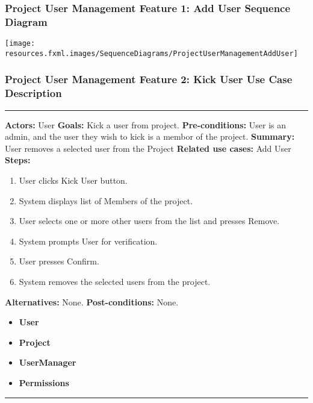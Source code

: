 \documentclass[twoside,letterpaper]{article}
\begin{document}
\subsubsection[Project User Management Feature 1: Add User Sequence Diagram]{\rmfamily\bfseries\color{black}
	Project User Management Feature 1: Add User Sequence Diagram}
\hypertarget{RefHeading22059017292}{}

\texttt{[image: resources.fxml.images/SequenceDiagrams/ProjectUserManagementAddUser]}

\newpage
\subsubsection[Project User Management Feature 2: Kick User Use Case Description]{\rmfamily\bfseries\color{black}
	Project User Management Feature 2: Kick User Use Case Description}
\hypertarget{RefHeading22059017292}{}

\vspace{2pt}
\hrule
\vspace{8pt}
 \textbf{Actors:} User \newline
\textbf{Goals:} Kick a user from project. \newline
 \textbf{Pre-conditions:} User is an admin, and the user they wish to kick is a membor of the project. \newline
 \textbf{Summary:} User removes a selected user from the Project \newline
\textbf{Related use cases:} Add User \newline
\textbf{Steps:} \begin{enumerate}
  \item User clicks Kick User button.
  \item System displays list of Members of the project.
  \item User selects one or more other users from the list and presses Remove.
  \item System prompts User for verification.
  \item User presses Confirm.
  \item System removes the selected users from the project.
 \end{enumerate}
 \textbf{Alternatives:} None. \newline
 \textbf{Post-conditions:} None. \newline
\begin{itemize}
	\item \textbf{User}
	\item \textbf{Project}
	\item \textbf{UserManager}
	\item \textbf{Permissions}
\end{itemize}
\vspace{8pt}
\hrule
\newpage
\end{document}
